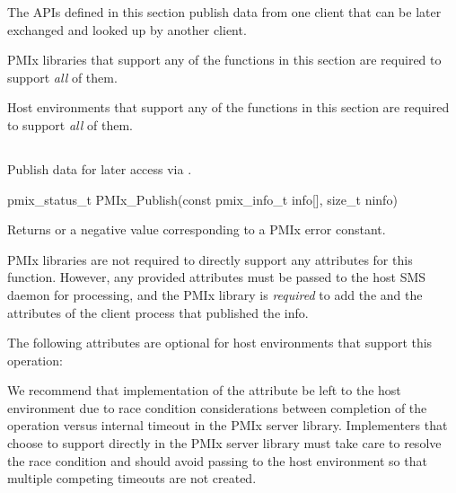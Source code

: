 The APIs defined in this section publish data from one client that can be later exchanged and looked up by another client.

\adviceimplstart
\ac{PMIx} libraries that support any of the functions in this section are required to support \textit{all} of them.
\adviceimplend

\advicermstart
Host environments that support any of the functions in this section are required to support \textit{all} of them.
\advicermend

\subsection{}

\summary

Publish data for later access via .

\format

\cspecificstart
\begin{codepar}
pmix_status_t
PMIx_Publish(const pmix_info_t info[], size_t ninfo)
\end{codepar}
\cspecificend

\begin{arglist}
\end{arglist}

Returns  or a negative value corresponding to a PMIx error constant.

\reqattrstart
\ac{PMIx} libraries are not required to directly support any attributes for this function. However, any provided attributes must be passed to the host \ac{SMS} daemon for processing, and the \ac{PMIx} library is \textit{required} to add the  and the  attributes of the client process that published the info.

\reqattrend

\optattrstart
The following attributes are optional for host environments that support this operation:


\optattrend

\adviceimplstart
We recommend that implementation of the  attribute be left to the host environment due to race condition considerations between completion of the operation versus internal timeout in the \ac{PMIx} server library. Implementers that choose to support  directly in the \ac{PMIx} server library must take care to resolve the race condition and should avoid passing  to the host environment so that multiple competing timeouts are not created.
\adviceimplend

